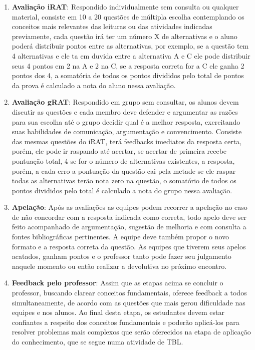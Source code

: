 \begin{enumerate}
  \item \textbf{Avaliação iRAT}: Respondido individualmente sem consulta ou qualquer material, consiste em 10 a 20 questões de múltipla escolha contemplando os conceitos mais relevantes das leituras ou das atividades indicadas previamente, cada questão irá ter um número X de alternativas e o aluno poderá distribuir pontos entre as alternativas, por exemplo, se a questão tem 4 alternativas e ele ta em duvida entre a alternativa A e C ele pode distribuir seus 4 pontos em 2 na A e 2 na C, se a resposta correta for a C ele ganha 2 pontos dos 4, a somatória de todos os pontos divididos pelo total de pontos da prova é calculado a nota do aluno nessa avaliação.
  \item \textbf{Avaliação gRAT}: Respondido em grupo sem consultar, os alunos devem discutir as questões e cada membro deve defender e argumentar as razões para sua escolha até o grupo decidir qual é a melhor resposta, exercitando suas habilidades de comunicação, argumentação e convencimento. Consiste das mesmas questões do iRAT, terá feedbacks imediatos da resposta certa, porém, ele pode ir raspando até acertar, se acertar de primeira recebe pontuação total, 4 se for o número de alternativas existentes, a resposta, porém, a cada erro a pontuação da questão cai pela metade se ele raspar todas as alternativas terão nota zero na questão, o somatório de todos os pontos divididos pelo total é calculado a nota do grupo nessa avaliação.
  \item \textbf{Apelação}: Após as avaliações as equipes podem recorrer a apelação no caso de não concordar com a resposta indicada como correta, todo apelo deve ser feito acompanhado de argumentação, sugestão de melhoria e com consulta a fontes bibliográficas pertinentes. A equipe deve também propor o novo formato e a resposta correta da questão. As equipes que tiverem seus apelos acatados, ganham pontos e o professor tanto pode fazer seu julgamento naquele momento ou então realizar a devolutiva no próximo encontro.
  \item \textbf{Feedback pelo professor}: Assim que as etapas acima se concluir o professor, buscando clarear conceitos fundamentais, oferece feedback a todos simultaneamente, de acordo com as questões que mais gerou dificuldade nas equipes e nos alunos. Ao final desta etapa, os estudantes devem estar confiantes a respeito dos conceitos fundamentais e poderão aplicá-los para resolver problemas mais complexos que serão oferecidos na etapa de aplicação do conhecimento, que se segue numa atividade de TBL.
\end{enumerate}

